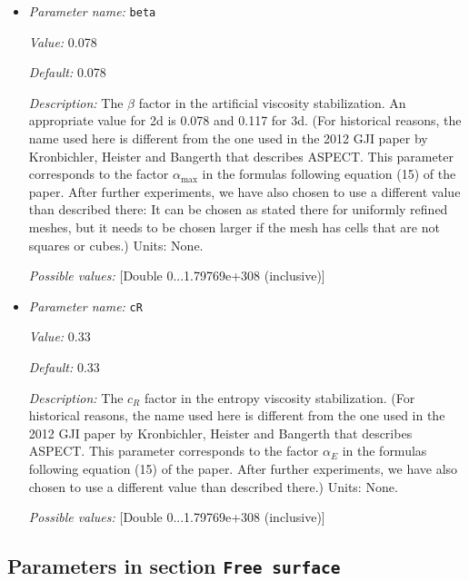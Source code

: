 \begin{itemize}
{\it Possible values:} [Integer range 1...2 (inclusive)]
\item {\it Parameter name:} {\tt beta}
\label{parameters:Discretization/Stabilization parameters/beta}


{\it Value:} 0.078


{\it Default:} 0.078


{\it Description:} The $\beta$ factor in the artificial viscosity stabilization. An appropriate value for 2d is 0.078 and 0.117 for 3d. (For historical reasons, the name used here is different from the one used in the 2012 GJI paper by Kronbichler, Heister and Bangerth that describes ASPECT. This parameter corresponds to the factor $\alpha_\text {max}$ in the formulas following equation (15) of the paper. After further experiments, we have also chosen to use a different value than described there: It can be chosen as stated there for uniformly refined meshes, but it needs to be chosen larger if the mesh has cells that are not squares or cubes.) Units: None.


{\it Possible values:} [Double 0...1.79769e+308 (inclusive)]
\item {\it Parameter name:} {\tt cR}
\label{parameters:Discretization/Stabilization parameters/cR}


{\it Value:} 0.33


{\it Default:} 0.33


{\it Description:} The $c_R$ factor in the entropy viscosity stabilization. (For historical reasons, the name used here is different from the one used in the 2012 GJI paper by Kronbichler, Heister and Bangerth that describes ASPECT. This parameter corresponds to the factor $\alpha_E$ in the formulas following equation (15) of the paper. After further experiments, we have also chosen to use a different value than described there.) Units: None.


{\it Possible values:} [Double 0...1.79769e+308 (inclusive)]
\end{itemize}

\subsection{Parameters in section \tt Free surface}
\label{parameters:Free_20surface}

